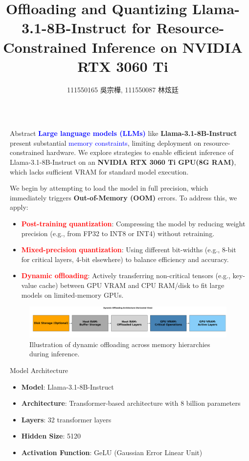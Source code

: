 \documentclass[final]{beamer}
\title{Offloading and Quantizing Llama-3.1-8B-Instruct for Resource-Constrained Inference on NVIDIA RTX 3060 Ti}
\author{111550165 吳宗樺, 111550087 林炫廷}
\newlength{\sepwidth}
\newlength{\colwidth}
\newcommand{\separatorcolumn}{\begin{column}{\sepwidth}\end{column}}
\begin{document}
\begin{frame}[t]
\begin{columns}[t]
 \separatorcolumn

 \begin{column}{\colwidth}
    \begin{block}{Abstract}
      \textbf{\textcolor{blue}{Large language models (LLMs)}} like \textbf{Llama-3.1-8B-Instruct} present substantial \textcolor{blue}{memory constraints}, limiting deployment on resource-constrained hardware. We explore strategies to enable efficient inference of Llama-3.1-8B-Instruct on an \textbf{NVIDIA RTX 3060 Ti GPU(8G RAM)}, which lacks sufficient VRAM for standard model execution.

We begin by attempting to load the model in full precision, which immediately triggers \textbf{Out-of-Memory (OOM)} errors. To address this, we apply:

\vspace{-0.5em}
\begin{itemize}
  \item \textbf{\textcolor{red}{Post-training quantization}}: Compressing the model by reducing weight precision (e.g., from FP32 to INT8 or INT4) without retraining.
  \item \textbf{\textcolor{red}{Mixed-precision quantization}}: Using different bit-widths (e.g., 8-bit for critical layers, 4-bit elsewhere) to balance efficiency and accuracy.
  \item \textbf{\textcolor{red}{Dynamic offloading}}: Actively transferring non-critical tensors (e.g., key-value cache) between GPU VRAM and CPU RAM/disk to fit large models on limited-memory GPUs.
\end{itemize}
\vspace{-0.5em}

\begin{figure}
  \centering
  \includegraphics[width=1\colwidth]{dynamic_offloading_architecture.png}
  \caption{Illustration of dynamic offloading across memory hierarchies during inference.}
  \label{fig:llama_model}
\end{figure}
    \end{block}   
    \begin{block}{Model Architecture}
      \begin{itemize}
        \item \textbf{Model}: Llama-3.1-8B-Instruct
        \item \textbf{Architecture}: Transformer-based architecture with 8 billion parameters
        \item \textbf{Layers}: 32 transformer layers
        \item \textbf{Hidden Size}: 5120
        \item \textbf{Activation Function}: GeLU (Gaussian Error Linear Unit)
        

\end{itemize}
\end{block}
\end{column}
\end{columns}
\end{frame}
\end{document}
